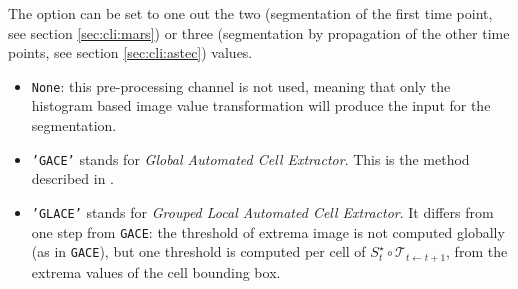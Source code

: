 The option  can be set to one out the two (segmentation of the first time point, see section \ref{sec:cli:mars}) or three (segmentation by propagation of the other time points, see section \ref{sec:cli:astec}) values.

\begin{itemize}
\itemsep -0.5ex
\item \texttt{None}: this pre-processing channel is not used, meaning that only the histogram based image value transformation will produce the input for the segmentation.
\item \texttt{'GACE'} stands for \textit{Global Automated Cell Extractor}. This is the method described in \cite{michelin:hal-00915000,michelin:tel-01451608}.
\item \texttt{'GLACE'} stands for \textit{Grouped Local Automated Cell Extractor}. It differs from one step from \texttt{GACE}: the threshold of extrema image is not computed globally (as in \texttt{GACE}), but one threshold is computed per cell of $S^{\star}_t \circ \mathcal{T}_{t \leftarrow t+1}$, from the extrema values of the cell bounding box.
\end{itemize}

